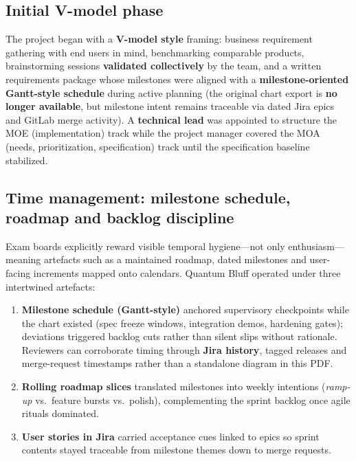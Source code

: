 \documentclass[11pt,a4paper]{article}
\begin{document}
\subsection{Initial V-model phase}

The project began with a \textbf{V-model style} framing: business requirement gathering with end users in mind, benchmarking comparable products, brainstorming sessions \textbf{validated collectively} by the team, and a written requirements package whose milestones were aligned with a \textbf{milestone-oriented Gantt-style schedule} during active planning (the original chart export is \textbf{no longer available}, but milestone intent remains traceable via dated Jira epics and GitLab merge activity). A \textbf{technical lead} was appointed to structure the MOE (implementation) track while the project manager covered the MOA (needs, prioritization, specification) track until the specification baseline stabilized.

\subsection{Time management: milestone schedule, roadmap and backlog discipline}

Exam boards explicitly reward visible temporal hygiene---not only enthusiasm---meaning artefacts such as a maintained roadmap, dated milestones and user-facing increments mapped onto calendars. Quantum Bluff operated under three intertwined artefacts:

\begin{enumerate}
\item \textbf{Milestone schedule (Gantt-style)} anchored supervisory checkpoints while the chart existed (spec freeze windows, integration demos, hardening gates); deviations triggered backlog cuts rather than silent slips without rationale. Reviewers can corroborate timing through \textbf{Jira history}, tagged releases and merge-request timestamps rather than a standalone diagram in this PDF.
\item \textbf{Rolling roadmap slices} translated milestones into weekly intentions (\textit{ramp-up} vs.\ feature bursts vs.\ polish), complementing the sprint backlog once agile rituals dominated.
\item \textbf{User stories in Jira} carried acceptance cues linked to epics so sprint contents stayed traceable from milestone themes down to merge requests.
\end{enumerate}
\end{document}
